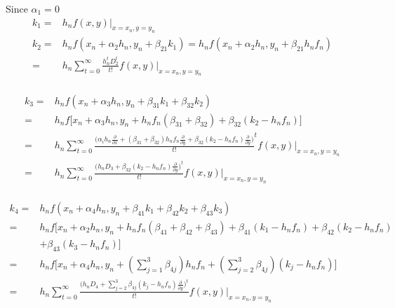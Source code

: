 \documentclass[12 pt]{article}
\begin{document}
	{
		\large
		Since $\alpha_{1} = 0$ 
		\begin{equation}
			\begin{split}
				k_{1} =& h_{n}f(x,y)\big\vert_{x = x_{n}, y= y_{n}}\\
				k_{2} =& h_{n}f(x_{n}+\alpha_{2}h_{n},y_{n}+\beta_{21}k_{1})=h_{n}f(x_{n}+\alpha_{2}h_{n},y_{n}+\beta_{21}h_{n}f_{n})\\
				=& h_{n} \sum_{t=0}^{\infty}\frac{h_{n}^{t}D_{2}^{t}}{t!}f(x,y)\big\vert_{x = x_{n}, y= y_{n}}\\     
			\end{split}
		\end{equation}
	}
	
	{
		\large
		\begin{equation}
			\begin{split}
				k_{3} = & h_{n}f(x_{n}+\alpha_{3}h_{n},y_{n}+\beta_{31}k_{1}+\beta_{32}k_{2})\\
				=	& h_{n}f\bigg[x_{n}+\alpha_{3}h_{n},y_{n}+h_{n}f_{n}(\beta_{31}+\beta_{32})+\beta_{32}(k_{2}-h_{n}f_{n})\bigg]\\
				= & h_{n}\sum_{t=0}^{\infty}\frac{\bigg(\alpha_{i}h_{n}\frac{\partial}{\partial x} + (\beta_{31}+\beta_{32})h_{n}f_{n}\frac{\partial}{\partial y} + \beta_{32}(k_{2}-h_{n}f_{n})\frac{\partial}{\partial y}\bigg)}{t!}^{t}f(x,y)\big\vert_{x = x_{n}, y= y_{n}}\\
				=&h_{n}\sum_{t=0}^{\infty}\frac{\bigg(h_{n}D_{3}+\beta_{32}(k_{2}-h_{n}f_{n})\frac{\partial}{\partial y}\bigg)^{t}}{t!}f(x,y)\big\vert_{x = x_{n}, y= y_{n}}\\ 
			\end{split}
		\end{equation}
	}
	
	
	
	{
		\begin{equation}
			\begin{split}	  	  
				k_{4} =& h_{n}f(x_{n}+\alpha_{4}h_{n},y_{n}+\beta_{41}k_{1}+\beta_{42}k_{2}+\beta_{43}k_{3})\\
				=& h_{n}f\bigg[x_{n}+\alpha_{2}h_{n},y_{n}+h_{n}f_{n}(\beta_{41}+\beta_{42}+\beta_{43})+\beta_{41}(k_{1}-h_{n}f_{n})+\beta_{42}(k_{2}-h_{n}f_{n})\\
				& +\beta_{43}(k_{3}-h_{n}f_{n})\bigg]\\
				=& h_{n}f\bigg[x_{n}+\alpha_{4}h_{n}, y_{n}+(\sum_{j=1}^{3}\beta_{4j})h_{n}f_{n} + (\sum_{j=2}^{3}\beta_{4j})(k_{j}-h_{n}f_{n})\bigg]\\
				=& h_{n}\sum_{t=0}^{\infty}\frac{\bigg(h_{n}D_{4}+\sum_{j=2}^{3}\beta_{4j}(k_{j}-h_{n}f_{n})\frac{\partial}{\partial y}\bigg)^{t}}{t!}f(x,y)\big\vert_{x = x_{n}, y= y_{n}}\\
			\end{split}
		\end{equation}
	}
	
\end{document}

